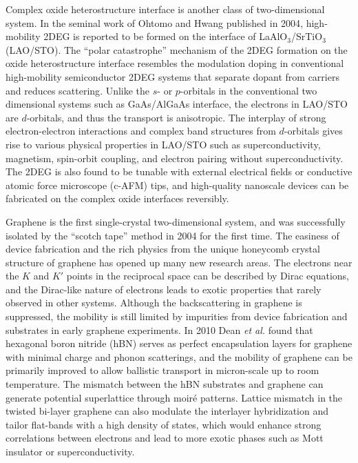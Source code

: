 \documentclass[pdflatex, sectionletters, 12pt]{pittetd}    %
\begin{document}
Complex oxide heterostructure interface is another class of two-dimensional system. In the seminal work of Ohtomo and Hwang published in 2004\cite{ohtomo2004high}, high-mobility 2DEG is reported to be formed on the interface of LaAlO$_3$/SrTiO$_3$ (LAO/STO). The ``polar catastrophe'' mechanism\cite{nakagawa2006some} of the 2DEG formation on the oxide heterostructure interface resembles the modulation doping in conventional high-mobility semiconductor 2DEG systems that separate dopant from carriers and reduces scattering\cite{bogorin2010laalo3}. Unlike the $s$- or $p$-orbitals in the conventional two dimensional systems such as GaAs/AlGaAs interface, the electrons in LAO/STO are $d$-orbitals\cite{salluzzo2009orbital}, and thus the transport is anisotropic\cite{annadi2013anisotropic}. The interplay of strong electron-electron interactions\cite{hwang2012emergent} and complex band structures from $d$-orbitals\cite{salluzzo2009orbital} gives rise to various physical properties in LAO/STO such as superconductivity\cite{reyren2007superconducting}, magnetism\cite{brinkman2007magnetic}, spin-orbit coupling\cite{caviglia2010tunable}, and electron pairing without superconductivity\cite{cheng2015electron}. The 2DEG is also found to be tunable with external electrical fields\cite{thiel2006tunable} or conductive atomic force microscope (c-AFM) tips\cite{cen2008nanoscale}, and high-quality nanoscale devices can be fabricated on the complex oxide interfaces reversibly\cite{cen2009oxide, irvin2010rewritable, cheng2011sketched, jnawali2015photoconductive, tomczyk2016micrometer, jiang2017direct, chen2019over}.

Graphene is the first single-crystal two-dimensional system, and was successfully isolated by the ``scotch tape'' method in 2004\cite{novoselov2004electric} for the first time. The easiness of device fabrication and the rich physics from the unique honeycomb crystal structure of graphene has opened up many new research areas. The electrons near the $K$ and $K'$ points in the reciprocal space can be described by Dirac equations\cite{wallace1947band, neto2009electronic}, and the Dirac-like nature of electrons\cite{novoselov2004electric, zhang2005experimental} leads to exotic properties that rarely observed in other systems. Although the backscattering in graphene is suppressed\cite{ando1998berry}, the mobility is still limited by impurities from device fabrication and substrates in early graphene experiments. In 2010 Dean \textit{et al.} found that hexagonal boron nitride (hBN) serves as perfect encapsulation layers for graphene with minimal charge and phonon scatterings\cite{dean2010naturenano}, and the mobility of graphene can be primarily improved to allow ballistic transport in micron-scale up to room temperature\cite{mayorov2011micrometer}. The mismatch between the hBN substrates and graphene can generate potential superlattice through moir{\'e} patterns. Lattice mismatch in the twisted bi-layer graphene can also modulate the interlayer hybridization and tailor flat-bands with a high density of states, which would enhance strong correlations between electrons and lead to more exotic phases such as Mott insulator\cite{cao2016superlattice, cao2018correlated, chen2018gate} or superconductivity\cite{cao2018unconventional}.
\end{document}

